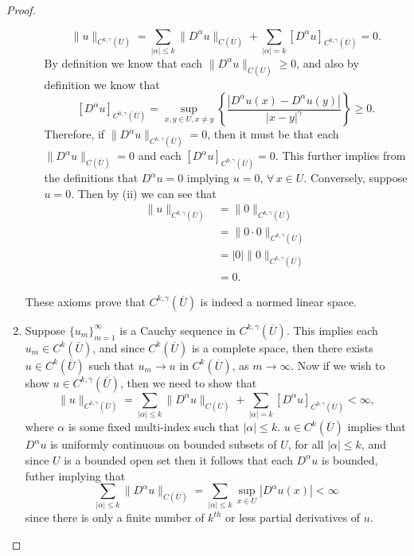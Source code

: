 \documentclass[11pt]{article}
\begin{document}
\begin{proof}
\begin{enumerate}[1.]
\begin{enumerate}[(i)]
					\[\|u\|_{C^{k,\gamma}(\overline{U})} = \sum_{|\alpha| \leq k}\|D^{\alpha}u\|_{C(\overline{U})} + \sum_{|\alpha| = k}[D^{\alpha}u]_{C^{0,\gamma}(\overline{U})} = 0.\]
					By definition we know that each $\|D^{\alpha}u\|_{C(\overline{U})} \geq 0$, and also by definition we know that
					\[[D^{\alpha}u]_{C^{0,\gamma}(\overline{U})} = \sup_{x,y \in U, x \not= y}{\left\{\frac{|D^{\alpha}u(x) - D^{\alpha}u(y)|}{|x-y|^{\gamma}}\right\}} \geq 0.\]
					Therefore, if $\|D^{\alpha}u\|_{C^{k,\gamma}(\overline{U})} = 0$, then it must be that each
					$\|D^{\alpha}u\|_{C(\overline{U})} = 0$ and each $[D^{\alpha}u]_{C^{0,\gamma}(\overline{U})} = 0$.
					This further implies from the definitions that $D^{\alpha}u = 0$ implying $u = 0$, $\forall \, x \in U$.
					Conversely, suppose $u = 0$. Then by (ii) we can see that
					\begin{align*}
						\|u\|_{C^{k,\gamma}(\overline{U})} &= \|0\|_{C^{k,\gamma}(\overline{U})} \\
										   &= \|0\cdot 0\|_{C^{k,\gamma}(\overline{U})} \\
										   &= |0|\|0\|_{C^{k,\gamma}(\overline{U})} \\
										   &= 0.
					\end{align*}
			\end{enumerate}
			These axioms prove that $C^{k,\gamma}(\overline{U})$ is indeed a normed linear space.
		\item Suppose $\{u_m\}_{m=1}^{\infty}$ is a Cauchy sequence in $C^{k,\gamma}(\overline{U})$.
            		This implies each $u_m \in C^k(\overline{U})$, and since $C^k(\overline{U})$ is a complete space,
			then there exists $u \in C^k(\overline{U})$ such that $u_m \rightarrow u$ in $C^k(\overline{U})$, as $m \rightarrow \infty$.
			Now if we wish to show $u \in C^{k,\gamma}(\overline{U})$, then we need to show that
			\[\|u\|_{C^{k,\gamma}(\overline{U})} = \sum_{|\alpha| \leq k}\|D^{\alpha}u\|_{C(\overline{U})} + \sum_{|\alpha| = k}[D^{\alpha}u]_{C^{0,\gamma}(\overline{U})} < \infty,\]
			where $\alpha$ is some fixed multi-index such that $|\alpha| \leq k$. 
			$u \in C^k(\overline{U})$ implies that $D^{\alpha}u$ is uniformly continuous on bounded subsets of $U$, for all $|\alpha| \leq k$,
			and since $U$ is a bounded open set then it follows that each $D^{\alpha}u$ is bounded, futher implying that
			\[\sum_{|\alpha| \leq k}\|D^{\alpha}u\|_{C(\overline{U})} = \sum_{|\alpha| \leq k}\sup_{x \in U}{|D^{\alpha}u(x)|} < \infty\]
			since there is only a finite number of $k^{th}$ or less partial derivatives of $u$.

\end{enumerate}
\end{proof}
\end{document}
